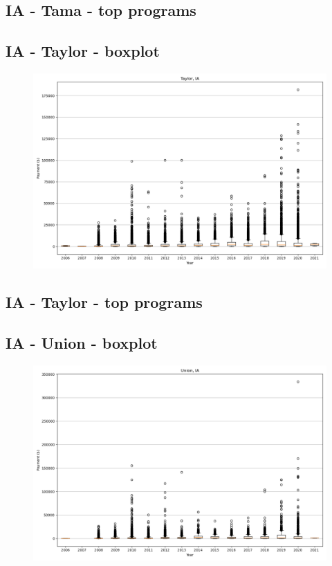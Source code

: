 \subsection*{IA - Tama - top programs}

\newpage
\subsection*{IA - Taylor - boxplot}
\begin{figure}[h]
\centering
\includegraphics[width=7in]{../output/boxplots/counties/Taylor-IA_boxplot.png}
\end{figure}


\subsection*{IA - Taylor - top programs}

\newpage
\subsection*{IA - Union - boxplot}
\begin{figure}[h]
\centering
\includegraphics[width=7in]{../output/boxplots/counties/Union-IA_boxplot.png}
\end{figure}


